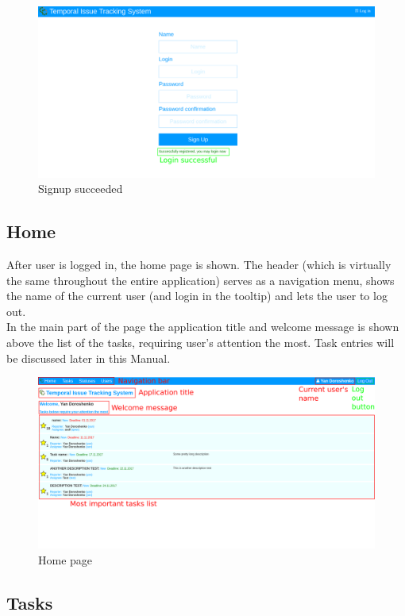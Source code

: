 \documentclass{article}
\begin{document}
\begin{figure}[H]
    \includegraphics[width=\textwidth]{img/signupsuccessful.png}
    \caption{Signup succeeded}
\end{figure}
\subsection{Home}
After user is logged in, the home page is shown. The header (which is virtually the same throughout the entire application) serves as a navigation menu, shows the name of the current user (and login in the tooltip) and lets the user to log out.\\
In the main part of the page the application title and welcome message is shown above the list of the tasks, requiring user's attention the most. Task entries will be discussed later in this Manual.
\begin{figure}[H]
    \includegraphics[width=\textwidth]{img/home.png}
    \caption{Home page}
\end{figure}
\subsection{Tasks}
\end{document}
